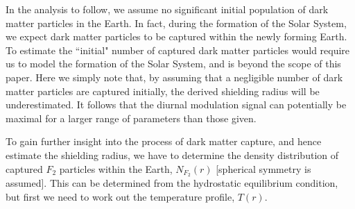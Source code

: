 \documentclass[12pt]{article}
\begin{document}
In the analysis to follow, we assume no significant initial population of dark matter particles in the Earth. In fact, during the formation of the Solar System, we expect dark matter particles to be captured within the newly forming Earth. To estimate the ``initial" number of captured dark matter particles would require us to model the formation of the Solar System, and is beyond the scope of this paper. Here we simply note that, by assuming that a negligible number of dark matter particles are captured initially, the derived shielding radius will be underestimated. It follows that the diurnal modulation signal can potentially be maximal for a larger range of parameters than those given.

To gain further insight into the process of dark matter capture, and hence estimate the shielding radius, we have to determine the density distribution of captured $F_2$ particles within the Earth, $N _{F_2}(r)$ [spherical symmetry is assumed]. This can be determined from the hydrostatic equilibrium condition, but first we need to work out the temperature profile, $T(r)$.
\end{document}
